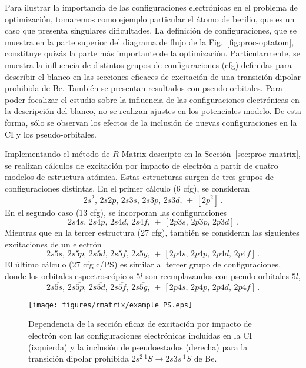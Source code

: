 Para ilustrar la importancia de las configuraciones electrónicas en el 
problema de optimización, tomaremos como ejemplo particular el átomo de 
berilio, que es un caso que presenta singulares dificultades. 
La definición de configuraciones, que se muestra en la parte superior 
del diagrama de flujo de la Fig.~\ref{fig:proc-optatom}, constituye 
quizás la parte más importante de la optimización. 
Particularmente, se muestra la influencia de distintos grupos de 
configuraciones (cfg) definidas para describir el blanco en las 
secciones eficaces de excitación de una transición dipolar 
prohibida de Be. También se presentan resultados con pseudo-orbitales. 
Para poder focalizar el estudio sobre la influencia de las 
configuraciones electrónicas en la descripción del blanco, no se 
realizan ajustes en los potenciales modelo. De esta forma, sólo se 
observan los efectos de la inclusión de nuevas configuraciones en la CI 
y los pseudo-orbitales. 

Implementando el método de $R$-Matrix descripto en la 
Sección~\ref{sec:proc-rmatrix}, se realizan cálculos de excitación por 
impacto de electrón a partir de cuatro modelos de estructura atómica. 
Estas estructuras surgen de tres grupos de configuraciones distintas. En 
el primer cálculo (6 cfg), se consideran  
\begin{equation}
2s^2,\,2s2p,\,2s3s,\,2s3p,\,2s3d,\,+\,
\left[2p^2\right]\,.
\label{eq:cfgA}
\end{equation} 
En el segundo caso (13 cfg), se incorporan las configuraciones 
\begin{equation}
2s4s,\,2s4p,\,2s4d,\,2s4f,\,+\,
\left[2p3s,\,2p3p,\,2p3d\right]\,.
\label{eq:cfgB}
\end{equation} 
Mientras que en la tercer estructura (27 cfg), también se consideran las 
siguientes excitaciones de un electrón 
\begin{equation}
2s5s,\,2s5p,\,2s5d,\,2s5f,\,2s5g,\,+\,
\left[2p4s,\,2p4p,\,2p4d,\,2p4f\right]\,.
\label{eq:cfgC}
\end{equation} 
El último cálculo (27 cfg c/PS) es similar al tercer grupo de 
configuraciones, donde los orbitales espectroscópicos $5l$ son 
reemplazandos con pseudo-orbitales $\overline{5l}$,
\begin{equation}
2s\overline{5s},\,2s\overline{5p},\,2s\overline{5d},\,2s\overline{5f},\,
2s\overline{5g},\,+\,
\left[2p4s,\,2p4p,\,2p4d,\,2p4f\right]\,.
\label{eq:cfgD}
\end{equation} 

\begin{figure}[t]
\centering
\texttt{[image: figures/rmatrix/example\_PS.eps]}
\caption[Dependencia de la sección eficaz de excitación con las 
configuraciones electrónicas y los pseudoestados.]
{Dependencia de la sección eficaz de excitación por impacto de
electrón con las configuraciones electrónicas incluidas en la CI 
(izquierda) y la inclusión de pseudoestados (derecha) para la transición 
dipolar prohibida $2s^2\,^1S \rightarrow 2s3s\,^1S$ de Be.}
\label{fig:dependencia-CI}
\end{figure}

